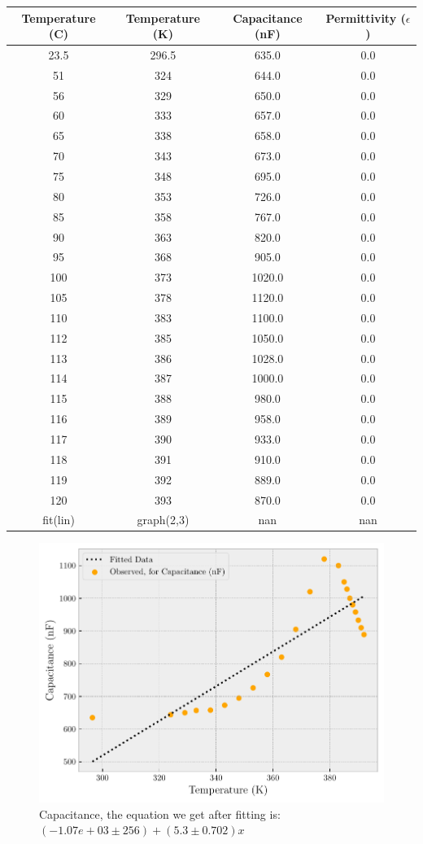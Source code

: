 \documentclass{double}
\begin{document}
\begin{tabular}{|c|c|c|c|}
\hline\textbf{Temperature (C)} & \textbf{Temperature (K)} & \textbf{Capacitance (nF)} & \textbf{Permittivity ($\epsilon$)}\\\hline
23.5 & 296.5 & 635.0 & 0.0\\\hline
51 & 324 & 644.0 & 0.0\\\hline
56 & 329 & 650.0 & 0.0\\\hline
60 & 333 & 657.0 & 0.0\\\hline
65 & 338 & 658.0 & 0.0\\\hline
70 & 343 & 673.0 & 0.0\\\hline
75 & 348 & 695.0 & 0.0\\\hline
80 & 353 & 726.0 & 0.0\\\hline
85 & 358 & 767.0 & 0.0\\\hline
90 & 363 & 820.0 & 0.0\\\hline
95 & 368 & 905.0 & 0.0\\\hline
100 & 373 & 1020.0 & 0.0\\\hline
105 & 378 & 1120.0 & 0.0\\\hline
110 & 383 & 1100.0 & 0.0\\\hline
112 & 385 & 1050.0 & 0.0\\\hline
113 & 386 & 1028.0 & 0.0\\\hline
114 & 387 & 1000.0 & 0.0\\\hline
115 & 388 & 980.0 & 0.0\\\hline
116 & 389 & 958.0 & 0.0\\\hline
117 & 390 & 933.0 & 0.0\\\hline
118 & 391 & 910.0 & 0.0\\\hline
119 & 392 & 889.0 & 0.0\\\hline
120 & 393 & 870.0 & 0.0\\\hline
fit(lin) & graph(2,3) & nan & nan\\\hline
\end{tabular}
\begin{figure}[H]
\centering
\includegraphics[width = \columnwidth]{./9Capacitance9.pdf}
\caption{Capacitance, the equation we get after fitting is: $(-1.07e+03 \pm 256) + (5.3 \pm 0.702)x$}
\label{fig:"capacitance"}
\end{figure}
 
\end{document}

